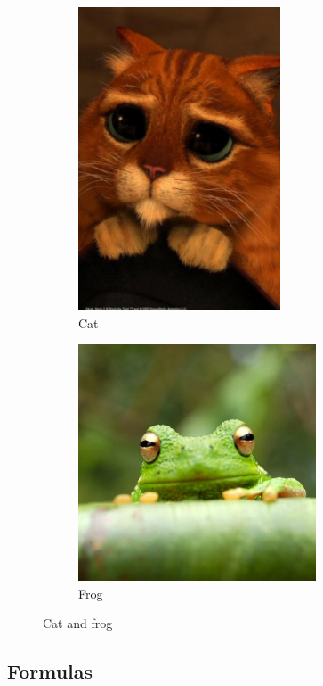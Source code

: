 \documentclass[a4paper]{article}
\begin{document}
\begin{figure}[b] %
 
    \begin{subfigure}{0.5\textwidth}
    \centering
    \includegraphics[width=0.5\linewidth, height=9cm]{Shrek.jpg} 
    \caption{Cat}
    \label{fig:subim1}
    \end{subfigure}
    \begin{subfigure}{0.5\textwidth}
    \includegraphics[width=0.9\linewidth, height=7cm]{frog.jpg}
    \caption{Frog}
    \label{fig:subim2}
    \end{subfigure}
 
\caption{Cat and frog}
\label{fig:zoo}
\end{figure}

\subsection{Formulas}

\vspace{4cm}
\end{document}
